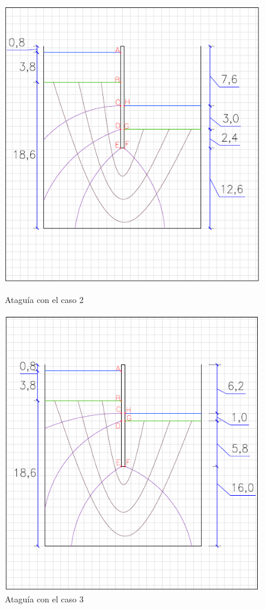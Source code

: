 \documentclass{article}
\begin{document}
\begin{figure}[h]
\begin{minipage}{0.32\textwidth}
        \centering
        \includegraphics[width=\textwidth]{graficos/At_caso2.png}
        \caption{Ataguía con el caso 2}
        \label{fig:At_caso2}
    \end{minipage}
    \hfill
    \begin{minipage}{0.32\textwidth}
        \centering
        \includegraphics[width=\textwidth]{graficos/At_caso3.png}
        \caption{Ataguía con el caso 3}
        \label{fig:At_caso3}
    \end{minipage}
\end{figure}
\end{document}
